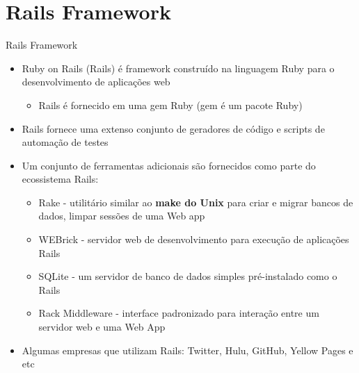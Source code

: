 \section{Rails Framework}

\begin{frame}{Rails Framework}
	\begin{itemize}
		\item Ruby on Rails (Rails) é framework construído na linguagem Ruby para o desenvolvimento de aplicações web
		\begin{itemize}
		  \item Rails é fornecido em uma \alert{gem} Ruby (gem é um pacote Ruby)
		\end{itemize}
		\item Rails fornece uma extenso conjunto de geradores de código e scripts de automação de testes
		\item Um conjunto de ferramentas adicionais são fornecidos como parte do ecossistema Rails:
		\begin{itemize}
			\item \alert{Rake} - utilitário similar ao \textbf{make do Unix} para criar e migrar bancos de dados, limpar sessões de uma Web app
			\item \alert{WEBrick} - servidor web de desenvolvimento para execução de aplicações Rails
			\item \alert{SQLite} - um servidor de banco de dados simples pré-instalado como o Rails
			\item \alert{Rack Middleware} - interface padronizado para interação entre um servidor web e uma Web App
		\end{itemize}
		\item Algumas empresas que utilizam Rails: Twitter, Hulu, GitHub, Yellow Pages e etc
	\end{itemize}
\end{frame}

